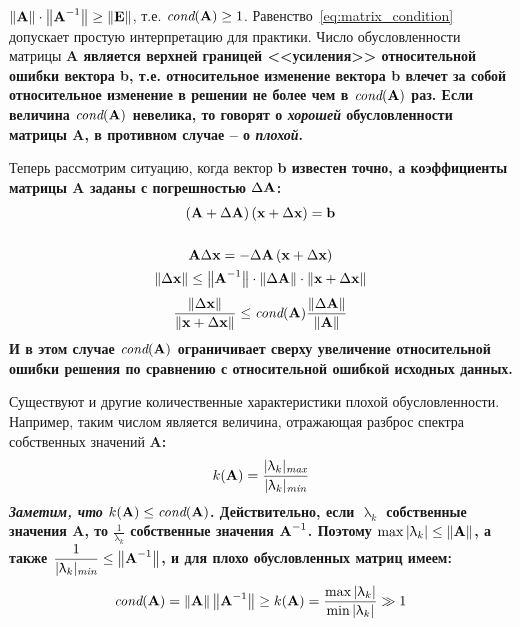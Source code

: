 \documentclass[../../calc-math-exam-2023.tex]{subfiles}
\begin{document}
    $\displaystyle \left\| \bf{A} \right\| \cdot \left\| \bf{A}^{-1} \right\| \geq \left\| \bf{E} \right\|$,
    т.е. $\textit{cond}(\bf{A}) \geq 1$. Равенство~\eqref{eq:matrix_condition} допускает простую интерпретацию
    для практики. Число обусловленности матрицы \bf{A} является верхней границей <<усиления>> относительной
    ошибки вектора \bf{b}, т.е. относительное изменение вектора \bf{b} влечет за собой относительное изменение
    в решении не более чем в $\textit{cond}(\bf{A})$ раз. Если величина $\textit{cond}(\bf{A})$ невелика, то
    говорят о \emph{хорошей} обусловленности матрицы \bf{A}, в противном случае -- о \emph{плохой}.
    \vspace{5pt}

    Теперь рассмотрим ситуацию, когда вектор \bf{b} известен точно, а коэффициенты матрицы \bf{A} заданы с
    погрешностью $\Delta \bf{A}$:
    \begin{gather*}
        \left( \bf{A} + \Delta \bf{A} \right)\left( \bf{x} + \Delta \bf{x} \right) = \bf{b}\\
        \\
        \bf{A}\Delta \bf{x} = - \Delta \bf{A} \left( \bf{x} + \Delta \bf{x} \right)\\
        \left\| \Delta \bf{x} \right\| \leq \left\| \bf{A}^{-1} \right\| \cdot \left\| \Delta \bf{A} \right\| \cdot \left\| \bf{x} + \Delta \bf{x} \right\|
    \end{gather*}
    \begin{equation}
        \frac{\left\| \Delta \bf{x} \right\|}{\left\| \bf{x} + \Delta \bf{x} \right\|} \leq \textit{cond}(\bf{A}) \frac{\left\| \Delta \bf{A} \right\|}{\left\| \bf{A} \right\|}
    \end{equation}
    И в этом случае $\textit{cond}(\bf{A})$ ограничивает сверху увеличение относительной ошибки решения по сравнению с
    относительной ошибкой исходных данных.
    \vspace{10pt}

    Существуют и другие количественные характеристики плохой обусловленности. Например, таким числом является
    величина, отражающая разброс спектра собственных значений \bf{A}:
    \begin{equation*}
        k(\bf{A}) = \frac{\displaystyle |\uplambda_k|_{\textit{max}}}{\displaystyle |\uplambda_k|_{\textit{min}}}
    \end{equation*}
    \emph{Заметим, что} $k(\bf{A}) \leq \textit{cond}(\bf{A})$. Действительно, если $\uplambda_k$ собственные
    значения \bf{A}, то $\displaystyle \frac{1}{\uplambda_k}$ собственные значения $\bf{A}^{-1}$. Поэтому
    $\displaystyle \max |\uplambda_k| \leq \left\| \bf{A} \right\|$, а также $\displaystyle \frac{1}{|\uplambda_k|_{\textit{min}}} \leq \left\| \bf{A}^{-1} \right\|$,
    и для плохо обусловленных матриц имеем:
    \begin{equation*}
        \textit{cond}(\bf{A}) = \left\| \bf{A} \right\| \left\| \bf{A}^{-1} \right\| \geq k(\bf{A}) = \frac{\max|\uplambda_k|}{\min|\uplambda_k|} \gg 1
    \end{equation*}
\end{document}
